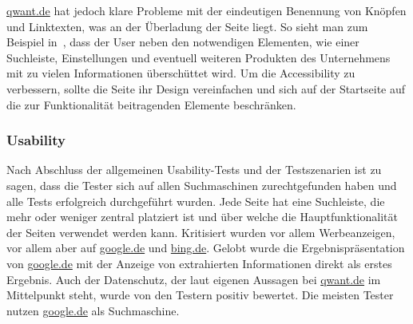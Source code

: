 \url{qwant.de} hat jedoch klare Probleme mit der eindeutigen Benennung von Knöpfen und Linktexten, was an der Überladung der Seite liegt.
So sieht man zum Beispiel in~, dass der User neben den notwendigen Elementen,
wie einer Suchleiste, Einstellungen und eventuell weiteren Produkten des Unternehmens mit zu vielen Informationen überschüttet wird.
Um die Accessibility zu verbessern, sollte die Seite ihr Design vereinfachen und sich auf der Startseite auf die zur Funktionalität beitragenden Elemente beschränken.

\subsubsection*{Usability}\label{subsubsec:usability}
Nach Abschluss der allgemeinen Usability-Tests und der Testszenarien ist zu sagen, dass
die Tester sich auf allen Suchmaschinen zurechtgefunden haben und alle Tests erfolgreich durchgeführt wurden.
Jede Seite hat eine Suchleiste, die mehr oder weniger zentral platziert ist und über welche die Hauptfunktionalität der Seiten verwendet werden kann.
Kritisiert wurden vor allem Werbeanzeigen, vor allem aber auf \url{google.de} und \url{bing.de}.
Gelobt wurde die Ergebnispräsentation von \url{google.de} mit der Anzeige von extrahierten Informationen direkt als erstes Ergebnis.
Auch der Datenschutz, der laut eigenen Aussagen bei \url{qwant.de} im Mittelpunkt steht, wurde von den Testern positiv bewertet.
Die meisten Tester nutzen \url{google.de} als Suchmaschine.